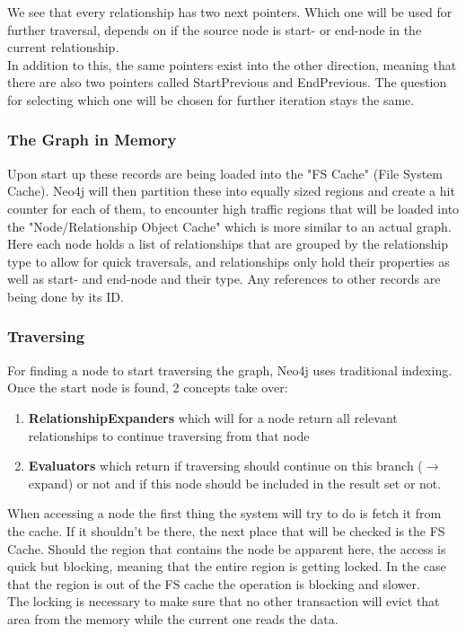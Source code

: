 \noindent
We see that every relationship has two next pointers. Which one will be used for further traversal, depends on if the source node is start- or end-node in the current relationship. \\
In addition to this, the same pointers exist into the other direction, meaning that there are also two pointers called StartPrevious and EndPrevious. The question for selecting which one will be chosen for further iteration stays the same.

\subsubsection{The Graph in Memory}
Upon start up these records are being loaded into the "FS Cache" (File System Cache). Neo4j will then partition these into equally sized regions and create a hit counter for each of them, to encounter high traffic regions that will be loaded into the "Node/Relationship Object Cache" which is more similar to an actual graph. \\
Here each node holds a list of relationships that are grouped by the relationship type to allow for quick traversals, and relationships only hold their properties as well as start- and end-node and their type. Any references to other records are being done by its ID. 

\subsubsection{Traversing}
For finding a node to start traversing the graph, Neo4j uses traditional indexing. \citep[minute 32]{NeoInternals} Once the start node is found, 2 concepts take over:
\begin{enumerate}
\item \textbf{RelationshipExpanders} which will for a node return all relevant relationships to continue traversing from that node
\item \textbf{Evaluators} which return if traversing should continue on this branch ($ \rightarrow $ expand) or not and if this node should be included in the result set or not.
\end{enumerate}
When accessing a node the first thing the system will try to do is fetch it from the cache. If it shouldn't be there, the next place that will be checked is the FS Cache. Should the region that contains the node be apparent here, the access is quick but blocking, meaning that the entire region is getting locked. In the case that the region is out of the FS cache the operation is blocking and slower. \\
The locking is necessary to make sure that no other transaction will evict that area from the memory while the current one reads the data.


